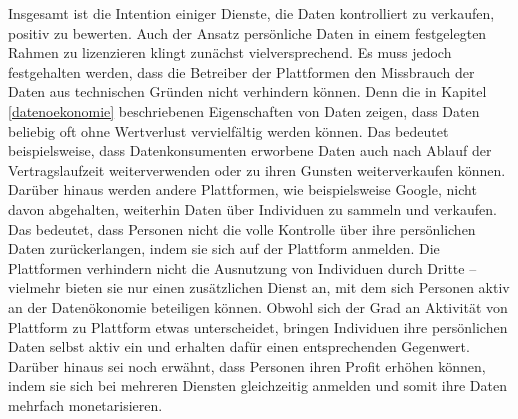 \noindent Insgesamt ist die Intention einiger Dienste, die Daten kontrolliert zu verkaufen, positiv zu bewerten. Auch der Ansatz persönliche Daten in einem festgelegten Rahmen zu lizenzieren klingt zunächst vielversprechend. Es muss jedoch festgehalten werden, dass die Betreiber der Plattformen den Missbrauch der Daten aus technischen Gründen nicht verhindern können. Denn die in Kapitel \ref{datenoekonomie} beschriebenen Eigenschaften von Daten zeigen, dass Daten beliebig oft ohne Wertverlust vervielfältig werden können. Das bedeutet beispielsweise, dass Datenkonsumenten erworbene Daten auch nach Ablauf der Vertragslaufzeit weiterverwenden oder zu ihren Gunsten weiterverkaufen können. Darüber hinaus werden andere Plattformen, wie beispielsweise Google, nicht davon abgehalten, weiterhin Daten über Individuen zu sammeln und verkaufen. Das bedeutet, dass Personen nicht die volle Kontrolle über ihre persönlichen Daten zurückerlangen, indem sie sich auf der Plattform anmelden. Die Plattformen verhindern nicht die Ausnutzung von Individuen durch Dritte -- vielmehr bieten sie nur einen zusätzlichen Dienst an, mit dem sich Personen aktiv an der Datenökonomie beteiligen können. Obwohl sich der Grad an Aktivität von Plattform zu Plattform etwas unterscheidet, bringen Individuen ihre persönlichen Daten selbst aktiv ein und erhalten dafür einen entsprechenden Gegenwert. Darüber hinaus sei noch erwähnt, dass Personen ihren Profit erhöhen können, indem sie sich bei mehreren Diensten gleichzeitig anmelden und somit ihre Daten mehrfach monetarisieren.
